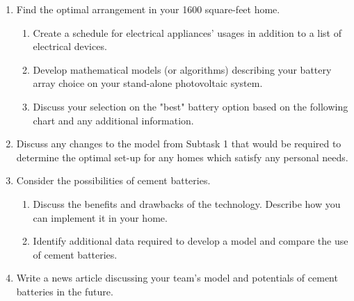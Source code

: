 \begin{enumerate}

\item Find the optimal arrangement in your 1600 square-feet home.

\begin{enumerate}
    \item Create a schedule for electrical appliances' usages in addition to a list of electrical devices.
    \item Develop mathematical models (or algorithms) describing your battery array choice on your stand-alone photovoltaic system.
    \item Discuss your selection on the "best" battery option based on the following chart and any additional information.
\end{enumerate}

\item Discuss any changes to the model from Subtask 1 that would be required to determine the optimal set-up for any homes which satisfy any personal needs.
\item Consider the possibilities of cement batteries.

\begin{enumerate}
    \item Discuss the benefits and drawbacks of the technology. Describe how you can implement it in your home.
    \item Identify additional data required to develop a model and compare the use of cement batteries.
\end{enumerate}

\item Write a news article discussing your team's model and potentials of cement batteries in the future.

\end{enumerate}
